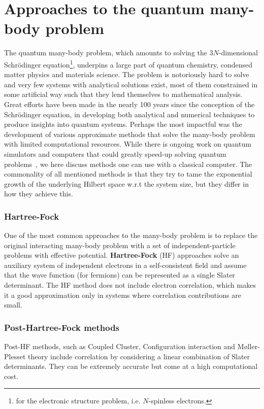 \section{Approaches to the quantum many-body problem}
\label{sec:QMBP}
The quantum many-body problem, which amounts to solving the $3N$-dimensional Schr\"odinger equation\footnote{for the electronic structure problem, i.e. $N$-spinless electrons.}, underpins a large part of quantum chemistry, condensed matter physics and materials science. The problem is notoriously hard to solve and very few systems with analytical solutions exist, most of them constrained in some artificial way such that they lend themselves to mathematical analysis. Great efforts have been made in the nearly 100 years since the conception of the Schr\" odinger equation, in developing both analytical and numerical techniques to produce insights into quantum systems. Perhaps the most impactful was the development of various approximate methods that solve the many-body problem with limited computational resources. While there is ongoing work on quantum simulators and computers that could greatly speed-up solving quantum problems~\cite{feynman2018simulating, childs2010relationship}, we here discuss methods one can use with a classical computer. The commonality of all mentioned methods is that they try to tame the exponential growth of the underlying Hilbert space w.r.t the system size, but they differ in how they achieve this. 

\subsubsection{Hartree-Fock}
One of the most common approaches to the many-body problem is to replace the original interacting many-body problem with a set of independent-particle problems with effective potential. \textbf{Hartree-Fock} (HF) approaches solve an auxiliary system of independent electrons in a self-consistent field and assume that the wave function (for fermions) can be represented as a single Slater determinant. The HF method does not include electron correlation, which makes it a good approximation only in systems where correlation contributions are small. 

\subsubsection{Post-Hartree-Fock methods}
Post-HF methods, such as Coupled Cluster, Configuration interaction and M\o ller-Plesset theory include correlation by considering a linear combination of Slater determinants. They can be extremely accurate but come at a high computational cost. 

